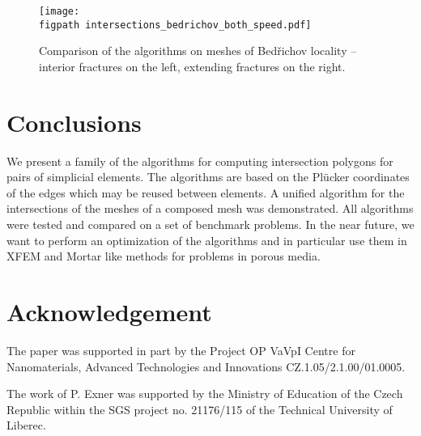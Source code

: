 \documentclass{elsarticle}
\newcommand{\figpath}{figures/}
\newcommand{\plucker}{Pl\"{u}cker }
\begin{document}
\begin{figure}[!htb]
    \centering
    \texttt{[image: \\figpath intersections\_bedrichov\_both\_speed.pdf]}
    \caption{Comparison of the algorithms on meshes of Bed{\v r}ichov locality -- interior fractures on the left,
             extending fractures on the right.}
    \label{fig:bedrichov_speed}
\end{figure}





\section{Conclusions}
\label{sec:conclusins}
We present a family of the algorithms for computing intersection polygons for pairs of simplicial elements.
The algorithms are based on the \plucker coordinates of the edges which may be reused between elements.
A unified algorithm for the intersections of the meshes of a composed mesh was demonstrated. All algorithms were 
tested and compared on a set of benchmark problems. In the near future, we want to perform an optimization of 
the algorithms and in particular use them in XFEM and Mortar 
like methods for problems in porous media.

\section{Acknowledgement}
The paper was supported in part by the Project OP VaVpI Centre for Nanomaterials, Advanced Technologies  and Innovations
CZ.1.05/2.1.00/01.0005.

The work of P. Exner was supported by the Ministry of Education of the Czech Republic within the SGS project no. 21176/115 of the Technical University of Liberec.





% 
% 
% 
  
 
\end{document}

